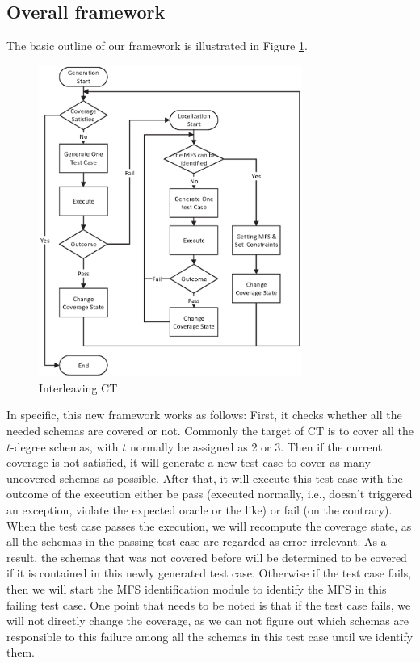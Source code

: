 \documentclass{sig-alternate}
\begin{document}
\subsection{Overall framework}
 The basic outline of our framework is illustrated in Figure \ref{new-life}.
\begin{figure}
 \includegraphics[width=3.4in]{baicOutline.eps}
\caption{Interleaving CT}
\label{new-life}
\end{figure}
In specific, this new framework works as follows: First, it checks whether all the needed schemas are covered or not. Commonly the target of CT is to cover all the $t$-degree schemas, with $t$ normally be assigned as 2 or 3. Then if the current coverage is not satisfied, it will generate a new test case to cover as many uncovered schemas as possible. After that, it will execute this test case with the outcome of the execution either be pass (executed normally, i.e., doesn't triggered an exception, violate the expected oracle or the like) or fail (on the contrary). When the test case passes the execution, we will recompute the coverage state, as all the schemas in the passing test case are regarded as error-irrelevant. As a result, the schemas that was not covered before will be determined to be covered if it is contained in this newly generated test case. Otherwise if the test case fails, then we will start the MFS identification module to identify the MFS in this failing test case. One point that needs to be noted is that if the test case fails, we will not directly change the coverage, as we can not figure out which schemas are responsible to this failure among all the schemas in this test case until we identify them.
\end{document}
